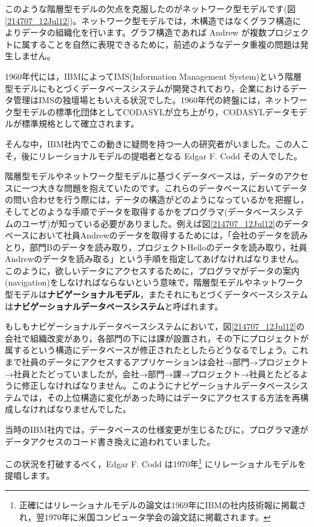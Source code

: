 このような階層型モデルの欠点を克服したのがネットワーク型モデルです(図\ref{214707_12Jul12})。ネットワーク型モデルでは，木構造ではなくグラフ構造によりデータの組織化を行います。グラフ構造であれば Andrew が複数プロジェクトに属することを自然に表現できるために，前述のようなデータ重複の問題は発生しません。


1960年代には，IBMによってIMS(Information Management System)という階層型モデルにもとづくデータベースシステムが開発されており，企業におけるデータ管理はIMSの独壇場ともいえる状況でした。1960年代の終盤には，ネットワーク型モデルの標準化団体としてCODASYLが立ち上がり，CODASYLデータモデルが標準規格として確立されます。


そんな中，IBM社内でこの動きに疑問を持つ一人の研究者がいました。この人こそ，後にリレーショナルモデルの提唱者となる Edgar F. Codd その人でした。


階層型モデルやネットワーク型モデルに基づくデータベースは，データのアクセスに一つ大きな問題を抱えていたのです。これらのデータベースにおいてデータの問い合わせを行う際には，データの構造がどのようになっているかを把握し，そしてどのような手順でデータを取得するかをプログラマ(データベースシステムのユーザ)が知っている必要がありました。例えば図\ref{214707_12Jul12}のデータベースにおいて社員Andrewのデータを取得するためには，「会社のデータを読みとり，部門Bのデータを読み取り，プロジェクトHelloのデータを読み取り，社員Andrewのデータを読み取る」という手順を指定してあげなければなりません。このように，欲しいデータにアクセスするために，プログラマがデータの案内(navigation)をしなければならないという意味で，階層型モデルやネットワーク型モデルは{\bf ナビゲーショナルモデル}，またそれにもとづくデータベースシステムは{\bf ナビゲーショナルデータベースシステム}と呼ばれます。


もしもナビゲーショナルデータベースシステムにおいて，図\ref{214707_12Jul12}の会社で組織改変があり，各部門の下には課が設置され，その下にプロジェクトが属するという構造にデータベースが修正されたとしたらどうなるでしょう。これまで社員のデータにアクセスするアプリケーションは会社→部門→プロジェクト→社員とたどっていましたが，会社→部門→課→プロジェクト→社員とたどるように修正しなければなりません。このようにナビゲーショナルデータベースシステムでは，その上位構造に変化があった時にはデータにアクセスする方法を再構成しなければなりませんでした。


当時のIBM社内では，データベースの仕様変更が生じるたびに，プログラマ達がデータアクセスのコード書き換えに追われていました。


この状況を打破するべく，Edgar F. Codd は1970年\footnote{正確にはリレーショナルモデルの論文は1969年にIBMの社内技術報に掲載され，翌1970年に米国コンピュータ学会の論文誌に掲載されます。} にリレーショナルモデルを提唱します。



